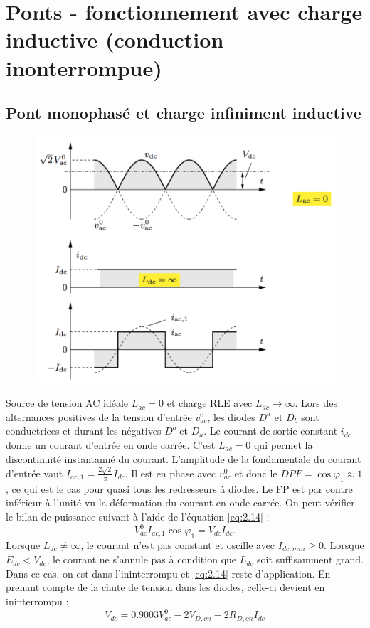 \section{Ponts - fonctionnement avec charge inductive (conduction inonterrompue)}
	\subsection{Pont monophasé et charge infiniment inductive}
		\begin{figure}
		\vspace{-5mm}
		\includegraphics[scale=0.3]{ch2/10}
		\end{figure} 
		Source de tension AC idéale $L_{ac} = 0$ et charge RLE avec $L_{dc}\rightarrow \infty$. Lors des alternances positives de la tension d'entrée $v_{ac}^0$, les diodes $D^a$ et $D_b$ sont conductrices et durant les négatives $D^b$ et $D_a$. Le courant de sortie constant $i_{dc}$ donne un courant d'entrée en onde carrée. C'est $L_{ac} = 0$ qui permet la discontinuité instantanné du courant. L'amplitude de la fondamentale du courant d'entrée vaut $I_{ac,1} = \frac{2\sqrt{2}}{\pi} I_{dc}$. Il est en phase avec $v_{ac}^0$ et donc le $DPF = \cos \varphi _1 \approx 1$, ce qui est le cas pour quasi tous les redresseurs à diodes. Le FP est par contre inférieur à l'unité vu la déformation du courant en onde carrée. On peut vérifier le bilan de puissance suivant à l'aide de l'équation \eqref{eq:2.14} : 
		\begin{equation}
			V_{ac}^0I_{ac,1} \cos \varphi _1 = V_{dc} I_{dc}.
		\end{equation}
		Lorsque $L_{dc} \neq \infty$, le courant n'est pas constant et oscille avec $I_{dc,min} \geq 0$. Lorsque $E_{dc}<V_{dc}$, le courant ne s'annule pas à condition que $L_{dc}$ soit suffisamment grand. Dans ce cas, on est dans l'ininterrompu et \eqref{eq:2.14} reste d'application. En prenant compte de la chute de tension dans les diodes, celle-ci devient en ininterrompu : 
		\begin{equation}
			V_{dc} = 0.9003V_{ac}^0 - 2 V_{D,on} - 2 R_{D,on} I_{dc}
		\end{equation}
		
